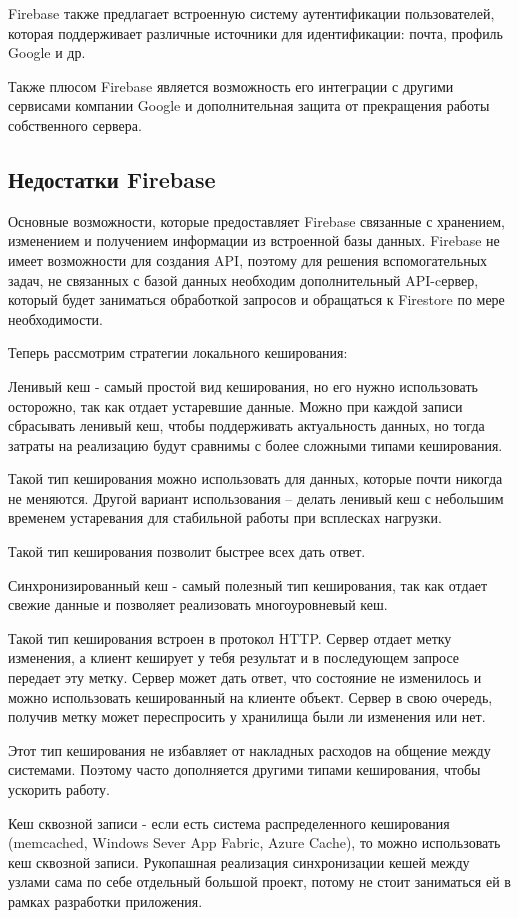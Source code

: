 Firebase также предлагает встроенную систему аутентификации пользователей, которая поддерживает различные источники для идентификации: почта, профиль Google и др.

Также плюсом Firebase является возможность его интеграции с другими сервисами компании Google и дополнительная защита от прекращения работы собственного сервера.

\subsection{Недостатки Firebase}
Основные возможности, которые предоставляет Firebase связанные с хранением, изменением и получением информации из встроенной базы данных. Firebase не имеет возможности для создания API, поэтому для решения вспомогательных задач, не связанных с базой данных необходим дополнительный API-cервер, который будет заниматься обработкой запросов и обращаться к Firestore по мере необходимости.

Теперь рассмотрим стратегии локального кеширования:

Ленивый кеш - самый простой вид кеширования, но его нужно использовать осторожно, так как отдает устаревшие данные. Можно при каждой записи сбрасывать ленивый кеш, чтобы поддерживать актуальность данных, но тогда затраты на реализацию будут сравнимы с более сложными типами кеширования\cite{web15}.

Такой тип кеширования можно использовать для данных, которые почти никогда не меняются. Другой вариант использования – делать ленивый кеш с небольшим временем устаревания для стабильной работы при всплесках нагрузки.

Такой тип кеширования позволит быстрее всех дать ответ.

Синхронизированный кеш - самый полезный тип кеширования, так как отдает свежие данные и позволяет реализовать многоуровневый кеш.

Такой тип кеширования встроен в протокол HTTP. Сервер отдает метку изменения, а клиент кеширует у тебя результат и в последующем запросе передает эту метку. Сервер может дать ответ, что состояние не изменилось и можно использовать кешированный на клиенте объект. Сервер в свою очередь, получив метку может переспросить у хранилища были ли изменения или нет.

Этот тип кеширования не избавляет от накладных расходов на общение между системами. Поэтому часто дополняется другими типами кеширования, чтобы ускорить работу.

Кеш сквозной записи - если есть система распределенного кеширования (memcached, Windows Sever App Fabric, Azure Cache), то можно использовать кеш сквозной записи. Рукопашная реализация синхронизации кешей между узлами сама по себе отдельный большой проект, потому не стоит заниматься ей в рамках разработки приложения.

